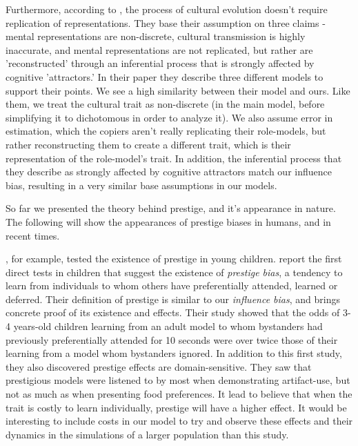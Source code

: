 \documentclass[12pt]{extarticle}
\begin{document}
Furthermore, according to \citet{no_replication}, the process of cultural evolution doesn't require replication of representations.
They base their assumption on three claims - mental representations are non-discrete, cultural transmission is highly inaccurate, and mental representations are not replicated, but rather are 'reconstructed' through an inferential process that is strongly affected by cognitive 'attractors.' In their paper they describe three different models to support their points.
We see a high similarity between their model and ours. Like them, we treat the cultural trait as non-discrete (in the main model, before simplifying it to dichotomous in order to analyze it). We also assume error in estimation, which the copiers aren't really replicating their role-models, but rather reconstructing them to create a different trait, which is their representation of the role-model's trait. In addition, the inferential process that they describe as strongly affected by cognitive attractors match our influence bias, resulting in a very similar base assumptions in our models.

So far we presented the theory behind prestige, and it's appearance in nature. The following will show the appearances of prestige biases in humans, and in recent times.

\citet{prestige_cultural_learning}, for example, tested the existence of prestige in young children. \citet{prestige_cultural_learning} report the first direct tests in children that suggest the existence of \textit{prestige bias}, a tendency to learn from individuals to whom others have preferentially attended, learned or deferred.
Their definition of prestige is similar to our \textit{influence bias}, and brings concrete proof of its existence and effects. Their study showed that the odds of 3-4 years-old children learning from an adult model to whom bystanders had previously preferentially attended for 10 seconds were over twice those of their learning from a model whom bystanders ignored.
In addition to this first study, they also discovered prestige effects are domain-sensitive. They saw that prestigious models were listened to by most when demonstrating artifact-use, but not as much as when presenting food preferences. It lead \citet{prestige_cultural_learning} to believe that when the trait is costly to learn individually, prestige will have a higher effect. It would be interesting to include costs in our model to try and observe these effects and their dynamics in the simulations of a larger population than this study.
\end{document}
